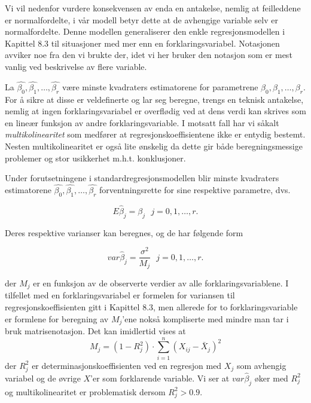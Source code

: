 \begin{center}  \end{center}

\noindent Vi vil nedenfor vurdere konsekvensen av enda en antakelse, nemlig at
feilleddene er normalfordelte, i vår modell betyr dette at de avhengige
variable selv er normalfordelte.  Denne modellen generaliserer den enkle
regresjonsmodellen i Kapittel 8.3 til situasjoner med mer enn en 
forklaringsvariabel.  Notasjonen avviker noe fra den vi brukte der, idet vi
her bruker den notasjon som er mest vanlig ved beskrivelse av flere variable.

La $ \hat{{\beta}_0},\hat{{\beta}_1}, \ldots,\hat{{\beta}_r}$ være minste
kvadraters
estimatorene for parametrene ${\beta}_0,{\beta}_1, \ldots, {\beta}_r$.  For
å sikre at disse er veldefinerte og lar seg beregne, trengs en teknisk
antakelse, nemlig at ingen forklaringsvariabel er overflødig ved at
dens verdi kan skrives som en lineær funksjon av andre forklaringsvariable.
I motsatt fall har vi såkalt {\em multikolinearitet} som medfører at
regresjonskoeffisientene ikke er entydig bestemt.  Nesten
multikolinearitet er også lite ønskelig da dette gir både
beregningsmessige problemer og stor usikkerhet m.h.t. konklusjoner. 

Under forutsetningene i standardregresjonsmodellen blir minste kvad\-raters
estimatorene $\hat{{\beta}_0},\hat{{\beta}_1},\ldots ,\hat{{\beta}_r}$
forventningsrette for sine respektive para\-metre, dvs.

\[   E{\hat{\beta}}_j={\beta}_j  \mbox{\ \ \ \ } j=0,1, \ldots,r. \]

\noindent Deres respektive varianser kan beregnes, og de har følgende form

\[ var{\hat{\beta}}_j=\frac{{\sigma}^2}{M_j} \mbox{\ \ \ \ } j=0,1,\ldots,r.\]

\noindent der $M_j$ er en funksjon av de observerte verdier av alle
forklaringsvariablene.  I tilfellet med en forklaringsvariabel er formelen
for variansen til regre\-sjons\-koeffi\-sienten gitt i Kapittel 8.3, men allerede
for to forklaringsvariable er formlene for beregning av $M_j$'ene nokså
kompliserte med mindre man tar i bruk matrisenotasjon.
Det kan imidlertid vises at
\[ M_j = (1-R_j^2) \cdot \sum_{i=1}^{n} (X_{ij}-\bar{X}_j)^2    \]
der $R_j^2$ er determinasjonskoeffisienten ved en regresjon med $X_j$ som
avhengig variabel og de øvrige $X$'er som forklarende variable.
Vi ser at $var{\hat{\beta}}_j$ øker med $R_j^2$ og multikolinearitet 
er problematisk dersom $R_j^2 > 0.9$.

